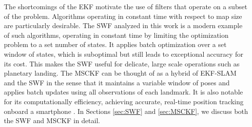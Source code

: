 \documentclass[letterpaper, 10 pt, conference]{ieeeconf}  %
\begin{document}
The shortcomings of the EKF motivate the use of filters that operate on a subset of the problem. Algorithms operating in constant time with respect to map size are particularly desirable.
The SWF analyzed in this work is a modern example of such algorithms, operating in constant time by limiting the optimization problem to a set number of states.
It applies batch optimization over a set window of states, which is suboptimal but still leads to exceptional accuracy for its cost.
This makes the SWF useful for delicate, large scale operations such as planetary landing\cite{Sibley:2010:JFR}. 
The MSCKF \cite{Mourikis:2006:TechReport,Mourikis:2007:ICRA} can be thought of as a hybrid of EKF-SLAM and the SWF in the sense that it maintains a variable window of poses and applies batch updates using all observations of each landmark. It is also notable for its computationally efficiency, achieving accurate, real-time position tracking onboard a smartphone \cite{Li:2013:ICRA}.
In Sections \ref{sec:SWF} and \ref{sec:MSCKF}, we discuss both the SWF and MSCKF in detail.


\end{document}
